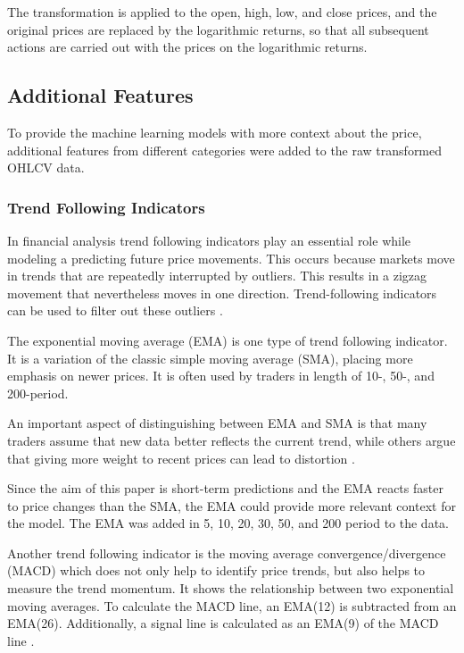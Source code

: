 \noindent
The transformation is applied to the open, high, low, and close prices, and the original prices are replaced by the logarithmic returns, so that all subsequent actions are carried out with the prices on the logarithmic returns.

\subsection{Additional Features}
\label{chap:additional-features}

To provide the machine learning models with more context about the price, additional features from different categories were added to the raw transformed OHLCV data.

\subsubsection{Trend Following Indicators}

In financial analysis trend following indicators play an essential role while modeling a predicting future price movements.
This occurs because markets move in trends that are repeatedly interrupted by outliers.
This results in a zigzag movement that nevertheless moves in one direction.
Trend-following indicators can be used to filter out these outliers \cite{investopia-trend-indicators}.

The exponential moving average (EMA) is one type of trend following indicator.
It is a variation of the classic simple moving average (SMA), placing more emphasis on newer prices.
It is often used by traders in length of 10-, 50-, and 200-period.

An important aspect of distinguishing between EMA and SMA is that many traders assume that new data better reflects the current trend, while others argue that giving more weight to recent prices can lead to distortion
\cite{investopia-ema}.

Since the aim of this paper is short-term predictions and the EMA reacts faster to price changes than the SMA, the EMA could provide more relevant context for the model.
The EMA was added in 5, 10, 20, 30, 50, and 200 period to the data.

Another trend following indicator is the moving average convergence/divergence \\(MACD) which does not only help to identify price trends, but also helps to measure the trend momentum.
It shows the relationship between two exponential moving averages.
To calculate the MACD line, an EMA(12) is subtracted from an EMA(26).
Additionally, a signal line is calculated as an EMA(9) of the MACD line \cite{investopia-macd}.



